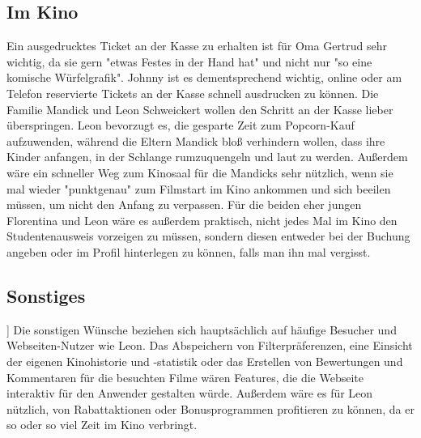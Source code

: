 \subsection{Im Kino}
Ein ausgedrucktes Ticket an der Kasse zu erhalten ist für Oma Gertrud sehr wichtig, da sie gern "etwas Festes in der Hand hat" und nicht nur "so eine komische Würfelgrafik".
Johnny ist es dementsprechend wichtig, online oder am Telefon reservierte Tickets an der Kasse schnell ausdrucken zu können.
Die Familie Mandick und Leon Schweickert wollen den Schritt an der Kasse lieber überspringen.
Leon bevorzugt es, die gesparte Zeit zum Popcorn-Kauf aufzuwenden, während die Eltern Mandick bloß verhindern wollen, dass ihre Kinder anfangen, in der Schlange rumzuquengeln und laut zu werden.
Außerdem wäre ein schneller Weg zum Kinosaal für die Mandicks sehr nützlich, wenn sie mal wieder "punktgenau" zum Filmstart im Kino ankommen und sich beeilen müssen, um nicht den Anfang zu verpassen.
Für die beiden eher jungen Florentina und Leon wäre es außerdem praktisch, nicht jedes Mal im Kino den Studentenausweis vorzeigen zu müssen, sondern diesen entweder bei der Buchung angeben oder im Profil hinterlegen zu können, falls man ihn mal vergisst.

\subsection{Sonstiges}]
Die sonstigen Wünsche beziehen sich hauptsächlich auf häufige Besucher und Webseiten-Nutzer wie Leon.
Das Abspeichern von Filterpräferenzen, eine Einsicht der eigenen Kinohistorie und -statistik oder das Erstellen von Bewertungen und Kommentaren für die besuchten Filme wären Features, die die Webseite interaktiv für den Anwender gestalten würde.
Außerdem wäre es für Leon nützlich, von Rabattaktionen oder Bonusprogrammen profitieren zu können, da er so oder so viel Zeit im Kino verbringt.
